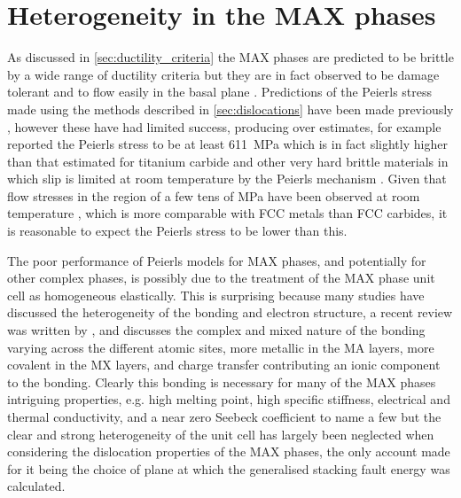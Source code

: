 \chapter{Heterogeneity in the MAX phases}
\label{chap:hetero_max_phases}

\graphicspath{{hetero_max_phases/Figs/}}


As  discussed in \autoref{sec:ductility_criteria} the MAX phases are predicted to be brittle by a wide range of ductility criteria but they are in fact observed to be damage tolerant and to flow easily in the basal plane \cite{Barsoum1999}.
Predictions of the Peierls stress made using the methods described in \autoref{sec:dislocations} have been made previously \cite{Music2007ductility,Gouriet2015}, however these have had limited success, producing over estimates, for example \citet{Gouriet2015} reported the Peierls stress to be at least \SI{611}{\mega\pascal} which is in fact slightly higher than that estimated for titanium carbide and other very hard brittle materials in which slip is limited at room temperature by the Peierls mechanism \cite{Chang1966,Clegg2006,Kamimura2011,Yadav2014}. Given that flow stresses in the region of a few tens of \si{\mega\pascal} have been observed at room temperature \cite{Humphrey2012,Barsoum1999}, which is more comparable with FCC metals than FCC carbides, it is reasonable to expect the Peierls stress to be lower than this.

The poor performance of Peierls models for MAX phases, and potentially for other complex phases, is possibly due to the treatment of the MAX phase unit cell as homogeneous elastically. This is surprising because many studies have discussed the heterogeneity of the bonding and electron structure, a recent review was written by \citet{Magnuson2017}, and discusses the complex and mixed nature of the bonding varying across the different atomic sites, more metallic in the MA layers, more covalent in the MX layers, and charge transfer contributing an ionic component to the bonding. Clearly this bonding is necessary for many of the MAX phases intriguing properties, e.g. high melting point, high specific stiffness, electrical and thermal conductivity, and a near zero Seebeck coefficient to name a few \cite{Yoo2000,Sun2011,Magnuson2017} but the clear and strong heterogeneity of the unit cell has largely been neglected when considering the dislocation properties of the MAX phases, the only account made for it being the choice of plane at which the generalised stacking fault energy was calculated.


